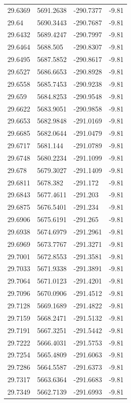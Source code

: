 \begin{table}[H]
\begin{tabular}{llll}
29.6369 & 5691.2638 & -290.7377 & -9.81 \\
29.64 & 5690.3443 & -290.7687 & -9.81 \\
29.6432 & 5689.4247 & -290.7997 & -9.81 \\
29.6464 & 5688.505 & -290.8307 & -9.81 \\
29.6495 & 5687.5852 & -290.8617 & -9.81 \\
29.6527 & 5686.6653 & -290.8928 & -9.81 \\
29.6558 & 5685.7453 & -290.9238 & -9.81 \\
29.659 & 5684.8253 & -290.9548 & -9.81 \\
29.6622 & 5683.9051 & -290.9858 & -9.81 \\
29.6653 & 5682.9848 & -291.0169 & -9.81 \\
29.6685 & 5682.0644 & -291.0479 & -9.81 \\
29.6717 & 5681.144 & -291.0789 & -9.81 \\
29.6748 & 5680.2234 & -291.1099 & -9.81 \\
29.678 & 5679.3027 & -291.1409 & -9.81 \\
29.6811 & 5678.382 & -291.172 & -9.81 \\
29.6843 & 5677.4611 & -291.203 & -9.81 \\
29.6875 & 5676.5401 & -291.234 & -9.81 \\
29.6906 & 5675.6191 & -291.265 & -9.81 \\
29.6938 & 5674.6979 & -291.2961 & -9.81 \\
29.6969 & 5673.7767 & -291.3271 & -9.81 \\
29.7001 & 5672.8553 & -291.3581 & -9.81 \\
29.7033 & 5671.9338 & -291.3891 & -9.81 \\
29.7064 & 5671.0123 & -291.4201 & -9.81 \\
29.7096 & 5670.0906 & -291.4512 & -9.81 \\
29.7128 & 5669.1689 & -291.4822 & -9.81 \\
29.7159 & 5668.2471 & -291.5132 & -9.81 \\
29.7191 & 5667.3251 & -291.5442 & -9.81 \\
29.7222 & 5666.4031 & -291.5753 & -9.81 \\
29.7254 & 5665.4809 & -291.6063 & -9.81 \\
29.7286 & 5664.5587 & -291.6373 & -9.81 \\
29.7317 & 5663.6364 & -291.6683 & -9.81 \\
29.7349 & 5662.7139 & -291.6993 & -9.81 \\

\end{tabular}
\end{table}
